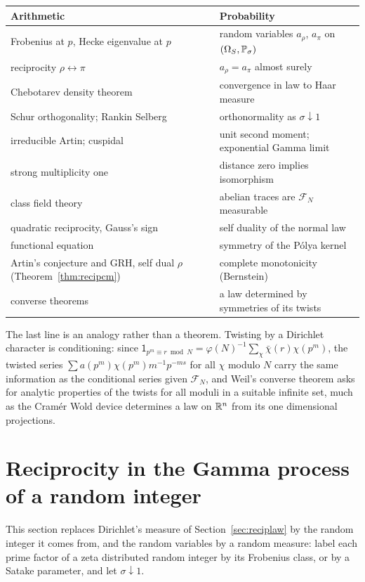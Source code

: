 \begin{center}\small
\begin{tabular}{p{}p{}}
\toprule
Arithmetic & Probability\\
\midrule
Frobenius at $p$, Hecke eigenvalue at $p$ & random variables $a_\rho$, $a_\pi$ on $(\Omega_S,\mathbb{P}_\sigma)$\\
reciprocity $\rho\leftrightarrow\pi$ & $a_\rho=a_\pi$ almost surely\\
Chebotarev density theorem & convergence in law to Haar measure\\
Schur orthogonality; Rankin Selberg & orthonormality as $\sigma\downarrow1$\\
irreducible Artin; cuspidal & unit second moment; exponential Gamma limit\\
strong multiplicity one & distance zero implies isomorphism\\
class field theory & abelian traces are $\mathcal F_N$ measurable\\
quadratic reciprocity, Gauss's sign & self duality of the normal law\\
functional equation & symmetry of the P\'olya kernel\\
Artin's conjecture and GRH, self dual $\rho$ (Theorem~\ref{thm:recipcm}) & complete monotonicity (Bernstein)\\
converse theorems & a law determined by symmetries of its twists\\
\bottomrule
\end{tabular}
\end{center}

The last line is an analogy rather than a theorem. Twisting by a Dirichlet character is conditioning: since $\mathsf{1}_{p^m\equiv r\bmod N}=\varphi(N)^{-1}\sum_\chi\bar\chi(r)\chi(p^m)$, the twisted series $\sum a(p^m)\chi(p^m)m^{-1}p^{-ms}$ for all $\chi$ modulo $N$ carry the same information as the conditional series given $\mathcal F_N$, and Weil's converse theorem asks for analytic properties of the twists for all moduli in a suitable infinite set, much as the Cram\'er Wold device determines a law on $\mathbb{R}^n$ from its one dimensional projections.

\section{Reciprocity in the Gamma process of a random integer}\label{sec:recipgammaproc}

This section replaces Dirichlet's measure of Section~\ref{sec:reciplaw} by the random integer it comes from, and the random variables by a random measure: label each prime factor of a zeta distributed random integer by its Frobenius class, or by a Satake parameter, and let $\sigma\downarrow1$.

